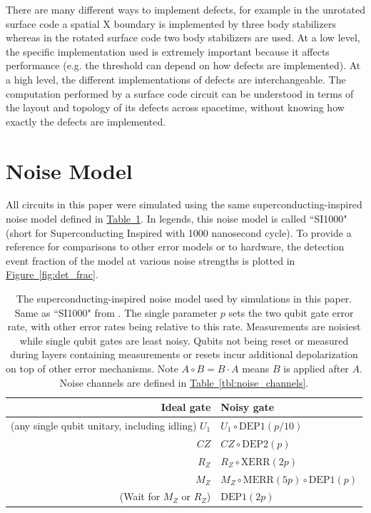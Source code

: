 \documentclass[onecolumn,unpublished,a4paper]{quantumarticle}
\theoremstyle{definition}
\theoremstyle{definition}
\theoremstyle{definition}
\newcommand{\fig}[1]{\hyperref[fig:#1]{Figure~\ref*{fig:#1}}}
\newcommand{\tbl}[1]{\hyperref[tbl:#1]{Table~\ref*{tbl:#1}}}
\begin{document}
There are many different ways to implement defects, for example in the unrotated surface code a spatial X boundary is implemented by three body stabilizers whereas in the rotated surface code two body stabilizers are used.
At a low level, the specific implementation used is extremely important because it affects performance (e.g. the threshold can depend on how defects are implemented).
At a high level, the different implementations of defects are interchangeable.
The computation performed by a surface code circuit can be understood in terms of the layout and topology of its defects across spacetime, without knowing how exactly the defects are implemented.

\section{Noise Model}
\label{app:noise_model}

All circuits in this paper were simulated using the same superconducting-inspired noise model defined in \tbl{noise_model}.
In legends, this noise model is called ``SI1000" (short for Superconducting Inspired with 1000 nanosecond cycle).
To provide a reference for comparisons to other error models or to hardware, the detection event fraction of the model at various noise strengths is plotted in \fig{det_frac}.

\begin{table}[H]
    \centering
    \begin{tabular}{|r|l|}
    \hline
    Ideal gate & Noisy gate
    \\
    \hline
    (any single qubit unitary, including idling) $U_1$ & $U_1 \circ \text{DEP1}(p / 10)$
    \\
    $CZ$ & $CZ \circ \text{DEP2}(p)$
    \\
    \hline
    $R_Z$ & $R_Z \circ \text{XERR}(2p)$
    \\
    $M_Z$ & $M_Z \circ \text{MERR}(5p) \circ \text{DEP1}(p)$
    \\
    \hline
    (Wait for $M_Z$ or $R_Z$) & $\text{DEP1}(2p)$
    \\
    \hline
    \end{tabular}
    \caption{
        The superconducting-inspired noise model used by simulations in this paper.
        Same as ``SI1000" from \cite{gidney2021honeycombmemory}.
        The single parameter $p$ sets the two qubit gate error rate, with other error rates being relative to this rate.
        Measurements are noisiest while single qubit gates are least noisy.
        Qubits not being reset or measured during layers containing measurements or resets incur additional depolarization on top of other error mechanisms.
        Note $A \circ B = B \cdot A$ means $B$ is applied after $A$.
        Noise channels are defined in \tbl{noise_channels}.
    }
    \label{tbl:noise_model}
\end{table}
\end{document}
